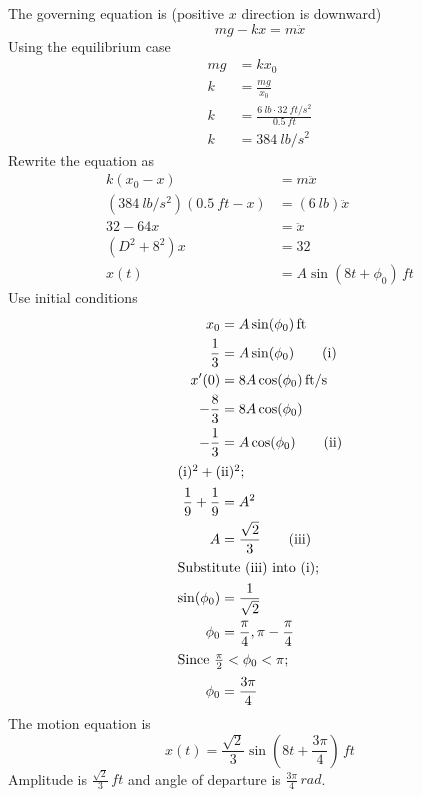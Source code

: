 \documentclass[12pt,final]{novelette} %
\begin{document}
\begin{question}
    \bigskip
    The governing equation is (positive $x$ direction is downward)
    $$
        mg - kx = m\ddot{x}
    $$
    Using the equilibrium case
    \begin{align*}
        mg & = kx_0                                                \\
        k  & = \frac{mg}{x_0}                                      \\
        k  & = \frac{\SI{6}{lb}\cdot\SI{32}{ft/s^2}}{\SI{0.5}{ft}} \\
        k  & = \SI{384}{lb/s^2}
    \end{align*}
    Rewrite the equation as
    \begin{align*}
        k(x_0 - x)                           & = m\ddot{x}                    \\
        (\SI{384}{lb/s^2})(\SI{0.5}{ft} - x) & = (\SI{6}{lb})\ddot{x}         \\
        32 - 64 x                            & = \ddot{x}                     \\
        (D^2+8^2)x                           & = 32                           \\
        x(t)                                 & = A \sin(8t + \phi_0)\,\si{ft}
    \end{align*}
    Use initial conditions
    \begin{align*}
        x_0               & = A \sin(\phi_0)\,\si{ft}    \\
        \frac13           & = A \sin(\phi_0) \tag{i}     \\
        x'(0)             & = 8A \cos(\phi_0)\,\si{ft/s} \\
        -\frac83          & = 8A \cos(\phi_0)            \\
        -\frac13          & = A \cos(\phi_0) \tag{ii}    \\
        \intertext{$(\mathrm i)^2 + (\mathrm{ii})^2$;}
        \frac19 + \frac19 & = A^2                        \\
        A                 & = \frac{\sqrt2}{3} \tag{iii} \\
        \intertext{Substitute (iii) into (i);}
        \sin(\phi_0)      & = \frac1{\sqrt2}             \\
        \phi_0            & = \frac\pi4, \pi - \frac\pi4 \\
        \intertext{Since $\frac\pi2 < \phi_0 < \pi$;}
        \phi_0            & = \frac{3\pi}{4}
    \end{align*}
    The motion equation is
    $$
        \boxed{x(t) = \frac{\sqrt2}{3}\sin\left(8t+\frac{3\pi}{4}\right)\,\si{ft}}
    $$
    Amplitude is $\boxed{\frac{\sqrt2}3\,\si{ft}}$ and angle of departure is $\boxed{\frac{3\pi}{4}\,\si{rad}}$.


\end{question}
\end{document}
